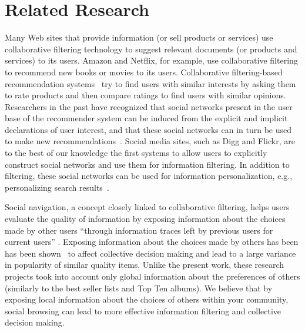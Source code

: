 \documentclass[]{article}
\begin{document}
\section{Related Research}
\label{sec:related}
Many Web sites that provide information (or sell products or
services) use collaborative filtering technology to suggest relevant
documents (or products and services) to its users. Amazon and
Netflix, for example, use collaborative filtering to recommend new
books or movies to its users. Collaborative filtering-based
recommendation systems~\cite{Konstan97grouplens} try to find users
with similar interests by asking them to rate products and then
compare ratings to find users with similar opinions. Researchers in
the past have recognized that social networks present in the user
base of the recommender system can be induced from the explicit and
implicit declarations of user interest, and that these social
networks can in turn be used to make new
recommendations~\cite{ReferralWeb,perugini04}. Social media sites,
such as Digg and Flickr, are to the best of our knowledge the first systems to
allow users to explicitly construct social networks and use them for
information filtering. In addition to filtering, these social
networks can be used for information personalization, e.g.,
personalizing search results~\cite{Lerman07flickrsearch}.


Social navigation, a concept closely linked to collaborative filtering,
helps users evaluate the quality of information
by exposing information about the choices made by other
users ``through information traces left by
previous users for current users'' \cite{dieberger00}.
Exposing information about the choices made by others
has been has been shown~\cite{Salganik06,Wu07} to affect collective decision
making and lead to a large variance in popularity
of similar quality items. Unlike the present work, these research projects took into account only global information
about the preferences of others (similarly to the best seller lists and Top Ten albums). We believe
that by exposing local information about the choices of others within
your community, social browsing can lead to more effective information
filtering and collective decision making.
\end{document}

